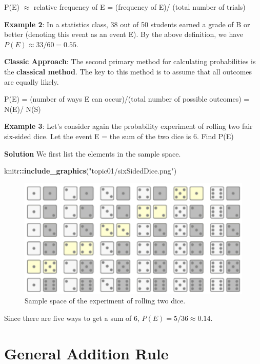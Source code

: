 \documentclass[
]{book}
\newenvironment{Shaded}{\begin{snugshade}}{\end{snugshade}}
\newcommand{\FunctionTok}[1]{\textcolor[rgb]{0.13,0.29,0.53}{\textbf{#1}}}
\newcommand{\NormalTok}[1]{#1}
\newcommand{\SpecialCharTok}[1]{\textcolor[rgb]{0.81,0.36,0.00}{\textbf{#1}}}
\newcommand{\StringTok}[1]{\textcolor[rgb]{0.31,0.60,0.02}{#1}}
\begin{document}
P(E) \(\approx\) relative frequency of E = (frequency of E)/ (total number of trials)

\hfill\break

\textbf{Example 2}: In a statistics class, 38 out of 50 students earned a grade of B or better (denoting this event as an event E). By the above definition, we have \(P(E) \approx 33/60 = 0.55\).

\textbf{Classic Approach}: The second primary method for calculating probabilities is the \textbf{classical method}. The key to this method is to assume that all outcomes are equally likely.

\hfill\break

P(E) = (number of ways E can occur)/(total number of possible outcomes) = N(E)/ N(S)

\hfill\break

\textbf{Example 3}: Let's consider again the probability experiment of rolling two fair six-sided dice. Let the event E = the sum of the two dice is 6. Find P(E)

\textbf{Solution} We first list the elements in the sample space.

\begin{Shaded}
\begin{Highlighting}[]
\NormalTok{knitr}\SpecialCharTok{::}\FunctionTok{include\_graphics}\NormalTok{(}\StringTok{"topic01/sixSidedDice.png"}\NormalTok{)}
\end{Highlighting}
\end{Shaded}

\begin{figure}

{\centering \includegraphics[width=0.5\linewidth]{topic01/sixSidedDice} 

}

\caption{Sample space of the experiment of rolling two dice.}\label{fig:unnamed-chunk-21}
\end{figure}

Since there are five ways to get a sum of 6, \(P(E) = 5/36 \approx 0.14\).

\hypertarget{general-addition-rule}{%
\section{General Addition Rule}\label{general-addition-rule}}
\end{document}
